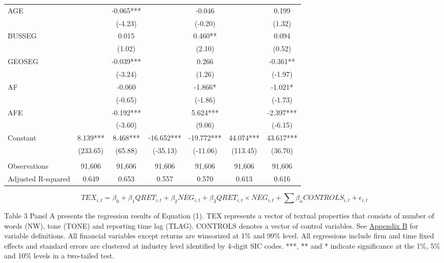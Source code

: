 \begin{table}[H]
\begin{center}
\begin{tabular}{lcccccc}
			AGE &   & -0.065*** &   & -0.046 &   & 0.199 \\
			&   & (-4.23) &   & (-0.20) &   & (1.32) \\
			BUSSEG &   & 0.015 &   & 0.460** &   & 0.094 \\
			&   & (1.02) &   & (2.10) &   & (0.52) \\
			GEOSEG &   & -0.039*** &   & 0.266 &   & -0.361** \\
			&   & (-3.24) &   & (1.26) &   & (-1.97) \\
			AF &   & -0.060 &   & -1.866* &   & -1.021* \\
			&   & (-0.65) &   & (-1.86) &   & (-1.73) \\
			AFE &   & -0.192*** &   & 5.624*** &   & -2.397*** \\
			&   & (-3.60) &   & (9.06) &   & (-6.15) \\
			Constant & 8.139*** & 8.468*** & -16.652*** & -19.772*** & 44.074*** & 43.617*** \\
			& (233.65) & (65.88) & (-35.13) & (-11.06) & (113.45) & (36.70) \\
			&   &   &   &   &   &  \\
			Observations & 91,606 & 91,606 & 91,606 & 91,606 & 91,606 & 91,606 \\
			Adjusted R-squared & 0.649 & 0.653 & 0.557 & 0.570 & 0.613 & 0.616 \\
			\bottomrule
			\bottomrule
		\end{tabular}%
	\end{center}
		\begin{footnotesize}
			\setcounter{equation}{0}
			\begin{equation}
				TEX_{i,t}=\beta_0+\beta_1QRET_{i,t}+\beta_2NEG_{i,t}+\beta_3QRET_{i,t}\times NEG_{i,t}+\sum\beta_nCONTROLS_{i,t}+\epsilon_{i,t}
			\end{equation}
			
			\noindent Table 3 Panel A presents the regression results of Equation (1). TEX represents a vector of textual properties that consists of number of words (NW), tone (TONE) and reporting time lag (TLAG). CONTROLS denotes a vector of control variables. See \hyperref[appb]{Appendix B} for variable definitions. All financial variables except returns are winsorized at 1\% and 99\% level. All regressions include firm and time fixed effects and standard errors are clustered at industry level identified by 4-digit SIC codes. ***, ** and * indicate significance at the 1\%, 5\% and 10\% levels in a two-tailed test.
		\end{footnotesize}
\end{table}%
